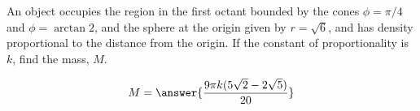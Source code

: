 \documentclass{ximera}
\author{David Guichard \and Neal Koblitz \and H. Jerome Keisler \and Albert Scheller \and Barry Balof \and Mike Wills \and Matthew Carr}
\begin{document}
\begin{exercise}




An object occupies the region in the first octant bounded by the cones $\phi=\pi/4$ and $\phi=\arctan 2$, and the sphere at the origin given by $r=\sqrt{6}$, and has density proportional to the distance from the origin. If the constant of proportionality is $k$, find the mass, $M$.
\begin{prompt}
\[
M=\answer{\frac{9\pi k(5\sqrt{2}-2\sqrt{5})}{20}}
\]
\end{prompt}



\end{exercise}
\end{document}
